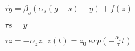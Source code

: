 \begin{equation}
    \begin{matrix}
        \tau \dot{y} = \beta_{s}(\alpha_{s}(g-s)- y) + f(z) \\
        \\
         \tau \dot{s} = y\\
         \\
         \tau \dot{z} = -\alpha_{z} z, \ z(t) = z_{0} \ exp(-\frac{\alpha_{z}}{\tau} t)
        \end{matrix}
    \label{eq:dmp}
\end{equation}
